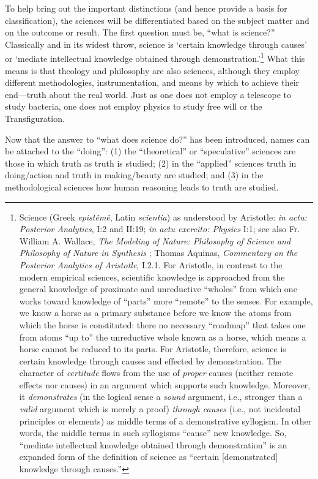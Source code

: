 To help bring out the important distinctions (and hence provide a basis for classification), the sciences will be differentiated based on the subject matter and on the outcome or result. The first question must be, ``what is science?'' Classically and in its widest throw, science is `certain knowledge through causes' or `mediate intellectual knowledge obtained through demonstration.'\footnote{
Science (Greek \textit{epistêmê}, Latin \textit{scientia}) as understood by Aristotle: \textit{in actu: Posterior Analytics}, I:2 and II:19; \textit{in actu exercito: Physics} I:1; see also Fr. William A. Wallace, \textit{The Modeling of Nature: Philosophy of Science and Philosophy of Nature in Synthesis} \citep[][p.~231]{wallace1997}; Thomas Aquinas, \textit{Commentary on the Posterior Analytics of Aristotle}, I.2.1. For Aristotle, in contrast to the modern empirical sciences, scientific knowledge is approached from the general knowledge of proximate and unreductive “wholes” from which one works toward knowledge of “parts” more “remote” to the senses. For example, we know a horse as a primary substance before we know the atoms from which the horse is constituted: there no necessary “roadmap” that takes one from atoms “up to” the unreductive whole known as a horse, which means a horse cannot be reduced to its parts. For Aristotle, therefore, science is certain knowledge through causes and effected by demonstration. The character of \textit{certitude} flows from the use of \textit{proper} causes (neither remote effects nor causes) in an argument which supports such knowledge. Moreover, it \textit{demonstrates} (in the logical sense a \textit{sound} argument, i.e., stronger than a \textit{valid} argument which is merely a proof) \textit{through causes} (i.e., not incidental principles or elements) as middle terms of a demonstrative syllogism. In other words, the middle terms in such syllogisms “cause” new knowledge. So, “mediate intellectual knowledge obtained through demonstration” is an expanded form of the definition of science as “certain [demonstrated] knowledge through causes.”
} What this means is that theology and philosophy are also sciences, although they employ different methodologies, instrumentation, and means by which to achieve their end---truth about the real world. Just as one does not employ a telescope to study bacteria, one does not employ physics to study free will or the Transfiguration.

Now that the answer to ``what does science do?'' has been introduced, names can be attached to the ``doing'': (1) the ``theoretical'' or ``speculative'' sciences are those in which truth as truth is studied; (2) in the ``applied'' sciences truth in doing/action and truth in making/beauty are studied; and (3) in the methodological sciences how human reasoning leads to truth are studied.

